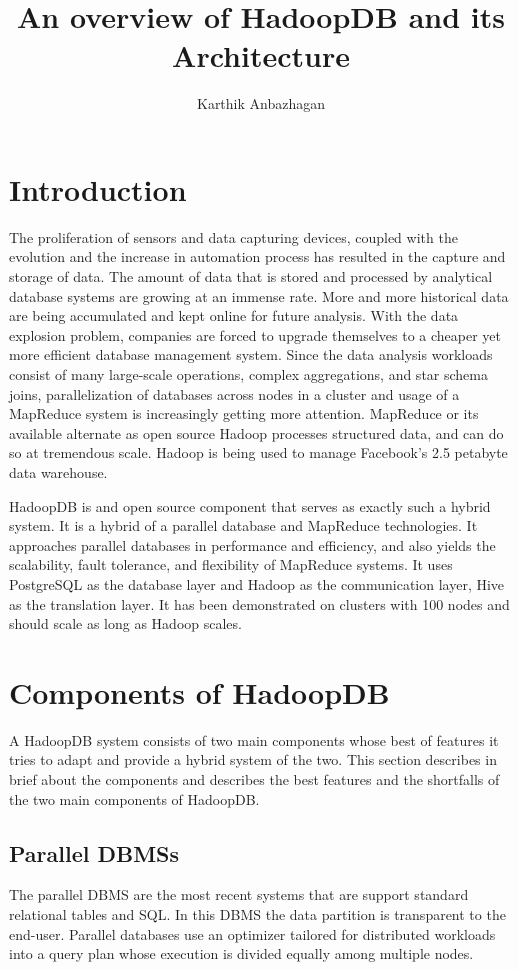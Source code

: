 \documentclass[9pt,twocolumn,twoside]{styles/osajnl}
\title{An overview of HadoopDB and its Architecture}
\author[1]{Karthik Anbazhagan}
\affil[1]{School of Informatics and Computing, Bloomington, IN 47408, U.S.A.}
\affil[*]{Corresponding authors: kartanba@iu.edu}
\begin{document}
\maketitle 


\section{Introduction}
The proliferation of sensors and data capturing devices, coupled with the evolution and the increase in automation process has resulted in the capture and storage of data. The amount of data that is stored and processed by analytical database systems are growing at an immense rate. More and more historical data are being accumulated and kept online for future analysis. With the data explosion problem, companies are forced to upgrade themselves to a cheaper yet more efficient database management system. Since the data analysis workloads consist of many large-scale operations, complex aggregations, and star schema joins, parallelization of databases across nodes in a cluster and usage of a MapReduce system is increasingly getting more attention. MapReduce or its available alternate as open source Hadoop processes structured data, and can do so at tremendous scale. Hadoop is being used to manage Facebook’s 2.5 petabyte data warehouse. 

HadoopDB\cite{hadoopdb} is and open source component that serves as exactly such a hybrid system. It is a hybrid of a parallel database and MapReduce technologies. It approaches parallel databases in performance and efficiency, and also yields the scalability, fault tolerance, and flexibility of MapReduce systems. It uses PostgreSQL as the database layer and Hadoop as the communication layer, Hive as the translation layer. It has been demonstrated on clusters with 100 nodes and should scale as long as Hadoop scales. 

\section{Components of HadoopDB}
A HadoopDB \cite{hadoopdb-project} system consists of two main components whose best of features it tries to adapt and provide a hybrid system of the two. This section describes in brief about the components and describes the best features and the shortfalls of the two main components of HadoopDB.

\subsection{Parallel DBMSs}
The parallel DBMS are the most recent systems that are support standard relational tables and SQL. In this DBMS the data partition is transparent to the end-user. Parallel databases use an optimizer tailored for distributed workloads into a query plan whose execution is divided equally among multiple nodes.
 
\end{document}
